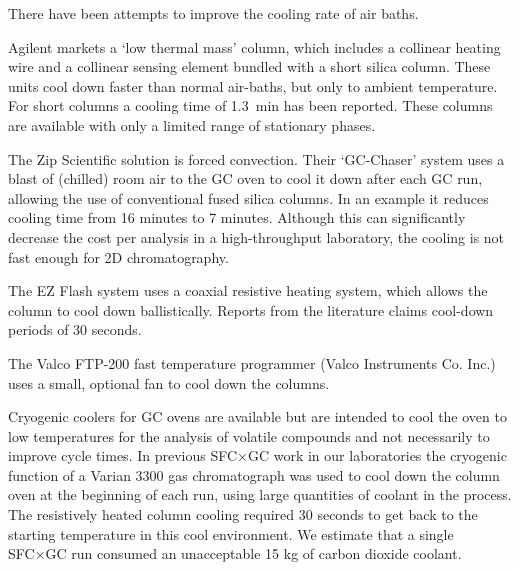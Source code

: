\documentclass[aip,rsi,preprint,graphicx]{revtex4-1} %
\begin{document}

There have been attempts to improve the cooling rate of air baths.

Agilent\texttrademark{} markets a `low thermal mass' column, which includes a
collinear heating wire and a collinear sensing element bundled with a short
silica column. These units cool down faster than normal air-baths, but only to
ambient temperature. For short columns a cooling time of \SI{1.3}{\minute} has
been reported\cite{Luong2006}. These columns are available with only a limited
range of stationary phases.

The Zip Scientific\texttrademark{} solution is forced convection. Their
`GC-Chaser' system uses a blast of (chilled) room air to the
GC oven to cool it down after each GC run, allowing the use of conventional
fused silica columns. In an example\cite{ZipScientific2008} it reduces cooling
time from 16 minutes to 7 minutes. Although this can significantly decrease the
cost per analysis in a high-throughput laboratory, the cooling is not fast
enough for 2D chromatography.

The EZ Flash\texttrademark{} system uses a coaxial resistive heating system,
which allows the column to cool down ballistically. Reports from the literature
claims cool-down periods of 30 seconds\cite{Dalluege1999}.

The Valco FTP-200 fast temperature programmer\cite{VICIAGI2019} (Valco
Instruments Co. Inc.) uses a small, optional fan to cool down the columns.

Cryogenic coolers for GC ovens are available but are intended to cool the oven
to low temperatures for the analysis of volatile compounds and not necessarily
to improve cycle times. In previous SFC×GC work in our
laboratories\cite{Venter2004, Venter2006} the cryogenic function of a Varian
3300 gas chromatograph was used to cool down the column oven at the beginning of
each run, using large quantities of coolant in the process. The resistively
heated column cooling required 30 seconds to get back to the starting
temperature in this cool environment. We estimate that a single SFC×GC run
consumed an unacceptable 15 kg of carbon dioxide coolant.

\end{document}
